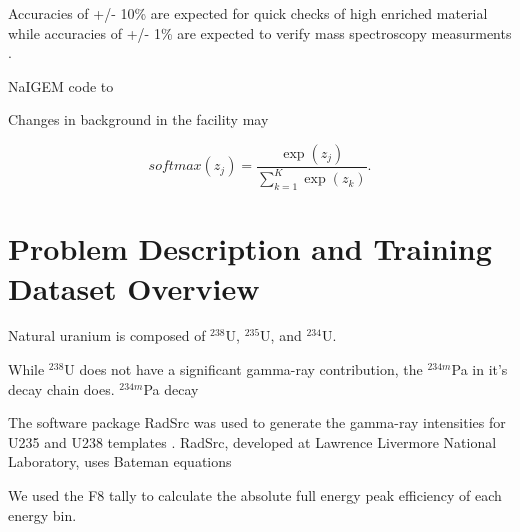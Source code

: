 Accuracies of +/- 10\% are expected for quick checks of high enriched material while accuracies of +/- 1\% are expected to verify mass spectroscopy measurments \cite{Kull1974}.


NaIGEM code to \cite{MORTREAU2004} 


Changes in background in the facility may 




\begin{equation} \label{eq:uenrichment}
softmax(z_j) = \frac{\exp(z_j)} {\sum_{k=1}^{K} \exp(z_k)}.
\end{equation}




\section{Problem Description and Training Dataset Overview}

Natural uranium is composed of $^{238}$U, $^{235}$U, and $^{234}$U. 

While $^{238}$U does not have a significant gamma-ray contribution, the $^{234m}$Pa in it's decay chain does. $^{234m}$Pa decay


The software package RadSrc was used to generate the gamma-ray intensities for U235 and U238 templates \cite{Hiller2007}. RadSrc, developed at Lawrence Livermore National Laboratory, uses Bateman equations 

We used the F8 tally to calculate the absolute full energy peak efficiency of each energy bin.





